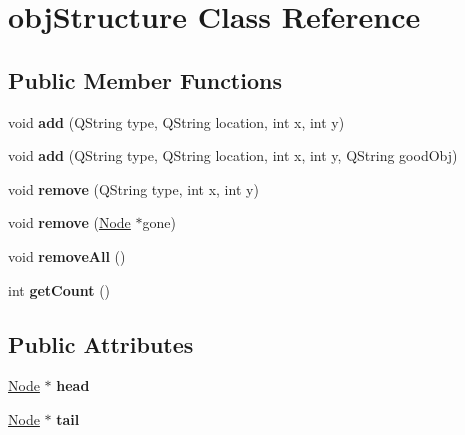 \hypertarget{classobj_structure}{\section{obj\-Structure Class Reference}
\label{classobj_structure}
}
\subsection*{Public Member Functions}
\begin{DoxyCompactItemize}
\item 
\hypertarget{classobj_structure_a471be95d137c9d40b45e49be917f3933}{void {\bfseries add} (Q\-String type, Q\-String location, int x, int y)}\label{classobj_structure_a471be95d137c9d40b45e49be917f3933}

\item 
\hypertarget{classobj_structure_a4bfcab0d9931a486b303a8be4d7f380a}{void {\bfseries add} (Q\-String type, Q\-String location, int x, int y, Q\-String good\-Obj)}\label{classobj_structure_a4bfcab0d9931a486b303a8be4d7f380a}

\item 
\hypertarget{classobj_structure_ad8ee59f0e4377ee81469edca96b6a623}{void {\bfseries remove} (Q\-String type, int x, int y)}\label{classobj_structure_ad8ee59f0e4377ee81469edca96b6a623}

\item 
\hypertarget{classobj_structure_a6efb04e79b755dffa27d22a48e51140d}{void {\bfseries remove} (\hyperlink{class_node}{Node} $\ast$gone)}\label{classobj_structure_a6efb04e79b755dffa27d22a48e51140d}

\item 
\hypertarget{classobj_structure_a41750e7cf482a5831d63b4bc0e494101}{void {\bfseries remove\-All} ()}\label{classobj_structure_a41750e7cf482a5831d63b4bc0e494101}

\item 
\hypertarget{classobj_structure_aa7c8aff07ac4acf636029ea3fd9a427b}{int {\bfseries get\-Count} ()}\label{classobj_structure_aa7c8aff07ac4acf636029ea3fd9a427b}

\end{DoxyCompactItemize}
\subsection*{Public Attributes}
\begin{DoxyCompactItemize}
\item 
\hypertarget{classobj_structure_aa7c0d7034f8597701ea1317bd6e144b1}{\hyperlink{class_node}{Node} $\ast$ {\bfseries head}}\label{classobj_structure_aa7c0d7034f8597701ea1317bd6e144b1}

\item 
\hypertarget{classobj_structure_ad49ade870fa2a6c48a1f875e9ecbb63b}{\hyperlink{class_node}{Node} $\ast$ {\bfseries tail}}\label{classobj_structure_ad49ade870fa2a6c48a1f875e9ecbb63b}

\end{DoxyCompactItemize}


